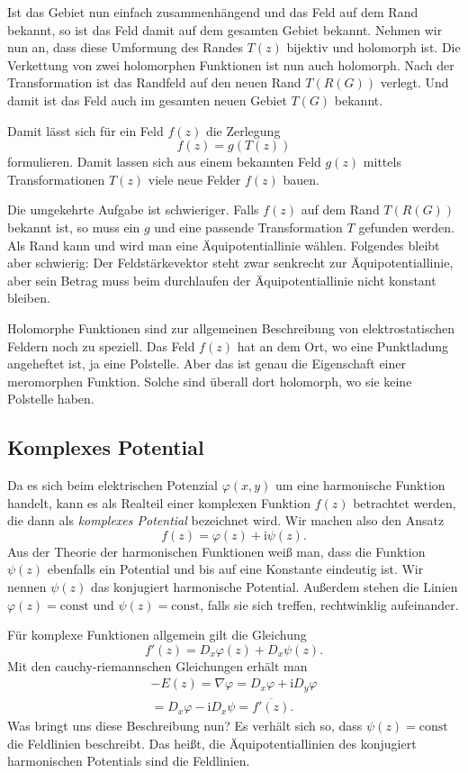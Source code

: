 \documentclass[a4paper,10pt,fleqn,twocolumn,twoside,dvipdfmx]{scrartcl}
\newcommand{\ui}{\mathrm i}
\begin{document}
Ist das Gebiet nun einfach zusammenhängend und das Feld auf dem
Rand bekannt, so ist das Feld damit auf dem gesamten Gebiet bekannt.
Nehmen wir nun an, dass diese Umformung des Randes $T(z)$ bijektiv
und holomorph ist. Die Verkettung von zwei
holomorphen Funktionen ist nun auch holomorph. Nach der
Transformation ist das Randfeld auf den neuen Rand
$T(R(G))$ verlegt. Und damit ist das Feld auch im gesamten neuen
Gebiet $T(G)$ bekannt.

Damit lässt sich für ein Feld $f(z)$ die Zerlegung%
\[f(z) = g(T(z))\]
formulieren. Damit lassen sich aus einem bekannten Feld $g(z)$
mittels Transformationen $T(z)$ viele neue Felder $f(z)$ bauen.

Die umgekehrte Aufgabe ist schwieriger. Falls $f(z)$ auf dem
Rand $T(R(G))$ bekannt ist, so muss ein $g$ und eine passende
Transformation $T$ gefunden werden. Als Rand kann und wird man eine
Äquipotentiallinie wählen. Folgendes bleibt aber schwierig: Der
Feldstärkevektor steht zwar senkrecht zur Äquipotentiallinie,
aber sein Betrag muss beim durchlaufen der Äquipotentiallinie
nicht konstant bleiben.

Holomorphe Funktionen sind zur allgemeinen Beschreibung von
elektrostatischen Feldern noch zu speziell. Das Feld $f(z)$ hat
an dem Ort, wo eine Punktladung angeheftet ist, ja eine Polstelle.
Aber das ist genau die Eigenschaft einer meromorphen Funktion. Solche
sind überall dort holomorph, wo sie keine Polstelle haben.


\subsection{Komplexes Potential}

Da es sich beim elektrischen Potenzial $\varphi(x,y)$ um eine harmonische
Funktion handelt, kann es als Realteil einer komplexen Funktion $f(z)$
betrachtet werden, die dann als \emph{komplexes Potential} bezeichnet wird.
Wir machen also den Ansatz%
\[f(z) = \varphi(z)+\ui\psi(z).\]
Aus der Theorie der harmonischen Funktionen weiß man, dass die
Funktion $\psi(z)$ ebenfalls ein Potential und bis auf eine
Konstante eindeutig ist. Wir nennen $\psi(z)$ das konjugiert
harmonische Potential. Außerdem stehen die Linien $\varphi(z)=\mathrm{const}$
und $\psi(z)=\mathrm{const}$, falls sie sich treffen,
rechtwinklig aufeinander.

Für komplexe Funktionen allgemein gilt die Gleichung%
\[f'(z) = D_x\varphi(z)+D_x\psi(z).\]
Mit den cauchy-riemannschen Gleichungen erhält man%
\begin{gather*}
-E(z) = \nabla\varphi = D_x\varphi+\ui D_y\varphi\\
= D_x\varphi-\ui D_x\psi = \overline{f'(z)}.
\end{gather*}
Was bringt uns diese Beschreibung nun? Es verhält sich so, dass
$\psi(z)=\mathrm{const}$ die Feldlinien beschreibt. Das heißt, die
Äquipotentiallinien des konjugiert harmonischen Potentials sind
die Feldlinien.
\end{document}
